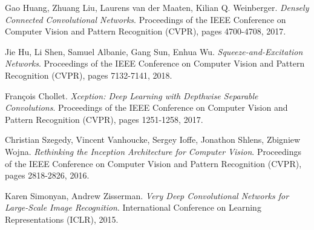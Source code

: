 \documentclass[11pt, a4paper]{article}
\begin{document}
\begin{thebibliography}{999}
 Gao Huang, Zhuang Liu, Laurens van der Maaten, Kilian Q. Weinberger. \textit{Densely Connected Convolutional Networks}. Proceedings of the IEEE Conference on Computer Vision and Pattern Recognition (CVPR), pages 4700-4708, 2017.

 Jie Hu, Li Shen, Samuel Albanie, Gang Sun, Enhua Wu. \textit{Squeeze-and-Excitation Networks}. Proceedings of the IEEE Conference on Computer Vision and Pattern Recognition (CVPR), pages 7132-7141, 2018.

 François Chollet. \textit{Xception: Deep Learning with Depthwise Separable Convolutions}. Proceedings of the IEEE Conference on Computer Vision and Pattern Recognition (CVPR), pages 1251-1258, 2017.

 Christian Szegedy, Vincent Vanhoucke, Sergey Ioffe, Jonathon Shlens, Zbigniew Wojna. \textit{Rethinking the Inception Architecture for Computer Vision}. Proceedings of the IEEE Conference on Computer Vision and Pattern Recognition (CVPR), pages 2818-2826, 2016.

 Karen Simonyan, Andrew Zisserman. \textit{Very Deep Convolutional Networks for Large-Scale Image Recognition}. International Conference on Learning Representations (ICLR), 2015.

\end{thebibliography}
\end{document}
